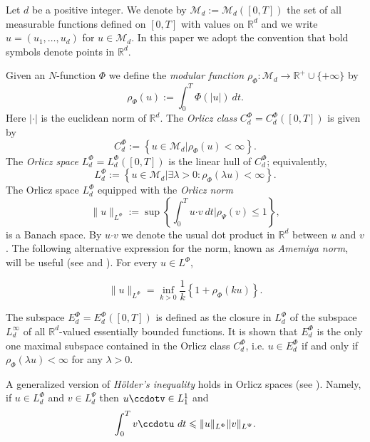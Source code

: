\documentclass[twoside]{article}
\theoremstyle{remark}
\newcommand{\orlnor}{\|_{L^{\Phi}}}
\newcommand{\lphi}{L^{\Phi}}
\newcommand{\lpsi}{L^{\Psi}}
\newcommand{\ephi}{E^{\Phi}}
\newcommand{\claseor}{C^{\Phi}}
\renewcommand{\b}[1]{\boldsymbol{#1}}
\renewcommand{\leq}{\leqslant}
\begin{document}
Let $d$ be a positive integer. We denote by $\mathcal{M}_d:=\mathcal{M}_d([0,T])$ the set of all measurable functions defined on $[0,T]$ with values on $\mathbb{R}^d$ and  we write $u=(u_1,\dots,u_d)$ for  $u\in \mathcal{M}_d$.
In this paper we adopt the convention that bold symbols denote points in $\mathbb{R}^d$.


Given  an $N$-function $\Phi$ we define the \emph{modular function} 
$\rho_{\Phi}:\mathcal{M}_d\to \mathbb{R}^+\cup\{+\infty\}$ by
\[\rho_{\Phi}(u):= \int_0^T \Phi(|u|)\ dt.\]
Here $|\cdot|$ is the euclidean norm of $\mathbb{R}^d$.
The \emph{Orlicz class} $C_d^{\Phi}=C_d^{\Phi}([0,T])$  is given  by
\begin{equation}\label{claseOrlicz}
  C^{\Phi}_d:=\left\{u\in \mathcal{M}_d | \rho_{\Phi}(u)< \infty \right\}.
\end{equation}
The \emph{Orlicz space} $\lphi_d=L^{\Phi}_d([0,T])$ is the linear hull of $\claseor_d$;
equivalently,
\begin{equation}\label{espacioOrlicz}
\lphi_d:=\left\{ u\in \mathcal{M}_d | \exists \lambda>0: \rho_{\Phi}(\lambda u) < \infty   \right\}.
\end{equation}
  The Orlicz space $\lphi_d$ equipped with the \emph{Orlicz norm}
\[
\|  u  \orlnor:=\sup \left\{  \int_0^T u\b{\cdot} v\ dt \big| \rho_{\Psi}(v)\leq 1\right\},
\]
is a Banach space. By $u\b{\cdot} v$ we denote the usual dot product in $\mathbb{R}^{d}$ between $u$ and $v$.
The following alternative expression for the norm, known as \emph{Amemiya norm},     will  be useful (see \cite[Thm. 10.5]{KR} and \cite{hudzik2000amemiya}). For every $u\in\lphi$,

\begin{equation}\label{amemiya}
\|u\orlnor=\inf\limits_{k>0}\frac{1}{k}\left\{1+\rho_{\Phi}(ku)\right\}.
\end{equation}



The subspace $\ephi_d=\ephi_d([0,T])$ is defined as the closure in $\lphi_d$ of the subspace $L^{\infty}_d$ of all $\mathbb{R}^d$-valued essentially bounded functions. It is shown that  $\ephi_d$ is the only one maximal subspace contained in the Orlicz class $\claseor_d$, i.e. 
$u\in\ephi_d$ if and only if $\rho_{\Phi}(\lambda u)<\infty$ for any $\lambda>0$.

A generalized version of \emph{H\"older's inequality} holds in Orlicz spaces (see \cite[Th. 9.3]{KR}). Namely, if $u\in\lphi_d$ and $v\in\lpsi_d$ then $u\ccdotv\in L_1^1$ and
\begin{equation}\label{holder}
\int_0^Tv\ccdotu\ dt\leq \|u\orlnor\|v\|_{L^{\Psi}}.
\end{equation}
\end{document}
